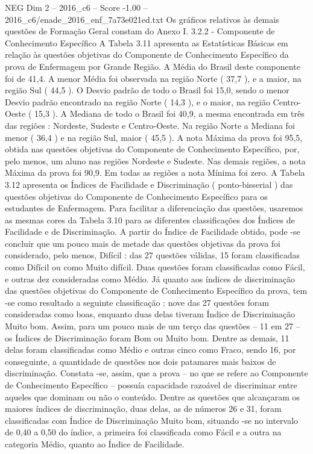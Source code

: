 \begin{textsample}{NEG Dim 2 – 2016\_c6 – Score -1.00 – 2016\_c6/enade\_2016\_enf\_7a73e021ed.txt}
Os gráficos relativos às demais questões de Formação Geral constam do Anexo I. 3.2.2 - Componente de Conhecimento Específico A Tabela 3.11 apresenta as Estatísticas Básicas em relação às questões objetivas do Componente de Conhecimento Específico da prova de Enfermagem por Grande Região.
A Média do Brasil deste componente foi de 41,4.
A menor Média foi observada na região Norte ( 37,7 ), e a maior, na região Sul ( 44,5 ).
O Desvio padrão de todo o Brasil foi 15,0, sendo o menor Desvio padrão encontrado na região Norte ( 14,3 ), e o maior, na região Centro-Oeste ( 15,3 ).
A Mediana de todo o Brasil foi 40,9, a mesma encontrada em três das regiões : Nordeste, Sudeste e Centro-Oeste.
Na região Norte a Mediana foi menor ( 36,4 ) e na região Sul, maior ( 45,5 ).
A nota Máxima da prova foi 95,5, obtida nas questões objetivas do Componente de Conhecimento Específico, por, pelo menos, um aluno nas regiões Nordeste e Sudeste.
Nas demais regiões, a nota Máxima da prova foi 90,9.
Em todas as regiões a nota Mínima foi zero.
A Tabela 3.12 apresenta os Índices de Facilidade e Discriminação ( ponto-bisserial ) das questões objetivas do Componente de Conhecimento Específico para os estudantes de Enfermagem.
Para facilitar a diferenciação das questões, usaremos as mesmas cores da Tabela 3.10 para as diferentes classificações dos Índices de Facilidade e de Discriminação.
A partir do Índice de Facilidade obtido, pode -se concluir que um pouco mais de metade das questões objetivas da prova foi considerado, pelo menos, Difícil : das 27 questões válidas, 15 foram classificadas como Difícil ou como Muito difícil.
Duas questões foram classificadas como Fácil, e outras dez consideradas como Médio.
Já quanto aos índices de discriminação das questões objetivas do Componente de Conhecimento Específico da prova, tem -se como resultado a seguinte classificação : nove das 27 questões foram consideradas como boas, enquanto duas delas tiveram Índice de Discriminação Muito bom.
Assim, para um pouco mais de um terço das questões – 11 em 27 – os Índices de Discriminação foram Bom ou Muito bom.
Dentre as demais, 11 delas foram classificadas como Médio e outras cinco como Fraco, sendo 16, por conseguinte, a quantidade de questões nos dois patamares mais baixos de discriminação.
Constata -se, assim, que a prova – no que se refere ao Componente de Conhecimento Específico – possuía capacidade razoável de discriminar entre aqueles que dominam ou não o conteúdo.
Dentre as questões que alcançaram os maiores índices de discriminação, duas delas, as de números 26 e 31, foram classificadas com Índice de Discriminação Muito bom, situando -se no intervalo de 0,40 a 0,50 do índice, a primeira foi classificada como Fácil e a outra na categoria Médio, quanto ao Índice de Facilidade.

\end{textsample}
